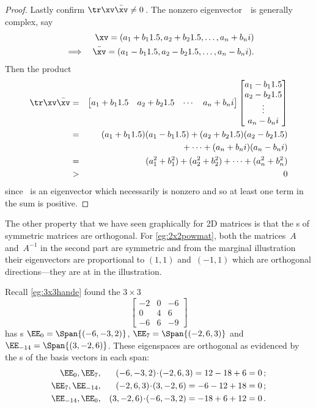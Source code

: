 \begin{proof}
Lastly confirm \(\tr\xv\bar\xv\neq0\)\,.  
The nonzero eigenvector~\xv\ is generally complex, say 
\begin{eqnarray*}
&&\xv=(a_1+b_1\i,a_2+b_2\i,\ldots,a_n+b_ni)
\\&\implies&\bar\xv=(a_1-b_1\i,a_2-b_2\i,\ldots,a_n-b_ni).
\end{eqnarray*}
Then the product
\begin{eqnarray*}
\tr\xv\bar\xv&=&
\begin{bmatrix} a_1+b_1\i&a_2+b_2\i&\cdots&a_n+b_ni \end{bmatrix}
\begin{bmatrix} a_1-b_1\i\\a_2-b_2\i\\\vdots\\a_n-b_ni \end{bmatrix}
\\&=&(a_1+b_1\i)(a_1-b_1\i)+(a_2+b_2\i)(a_2-b_2\i)
\\&&{}+\cdots+(a_n+b_ni)(a_n-b_ni)
\\&=&(a_1^2+b_1^2)+(a_2^2+b_2^2)+\cdots+(a_n^2+b_n^2)
\\&>&0
\end{eqnarray*}
since \xv~is an eigenvector which necessarily is nonzero and so at least one term in the sum is positive.
\end{proof}


The other property that we have seen graphically for 2D matrices is that the s of symmetric matrices are orthogonal.
For \autoref{eg:2x2powmat}, both the matrices~\(A\) and~\(A^{-1}\) in 
the second part are symmetric and from the marginal illustration their eigenvectors are proportional to \((1,1)\) and~\((-1,1)\) which are orthogonal directions---they are at  in the illustration.

\begin{example} 
Recall \autoref{eg:3x3hande} found the \(3\times3\) 
\begin{equation*}
\begin{bmatrix} -2&0&-6\\0&4&6\\-6&6&-9 \end{bmatrix}
\end{equation*}
has s \(\EE_0=\Span\{(-6,-3,2)\}\), \(\EE_7=\Span\{(-2,6,3)\}\) and \(\EE_{-14}=\Span\{(3,-2,6)\}\).
These eigenspaces are orthogonal as evidenced by the s of the basis vectors in each span:
\begin{eqnarray*}
\EE_0,\EE_7,&&
(-6,-3,2)\cdot(-2,6,3)=12-18+6=0\,;
\\
\EE_7,\EE_{-14},&&
(-2,6,3)\cdot(3,-2,6)=-6-12+18=0\,;
\\
\EE_{-14},\EE_0,&&
(3,-2,6)\cdot(-6,-3,2)=-18+6+12=0\,.
\end{eqnarray*}
\end{example}




